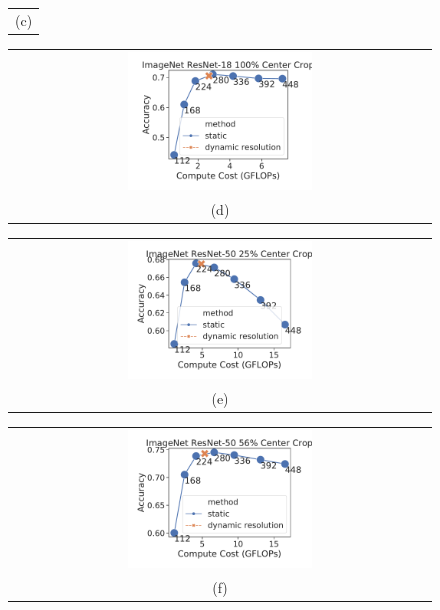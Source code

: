\begin{figure}[t]
\begin{tabular}{@{}c@{}}
    \small (c)
    \end{tabular}
    \begin{tabular}{@{}c@{}}
    \includegraphics[width=0.45\textwidth]{e2e_figures/imagenet_resnet18_full_center.pdf} \\
    \small (d)
    \end{tabular}
    \begin{tabular}{@{}c@{}}
    \includegraphics[width=0.45\textwidth]{e2e_figures/imagenet_resnet50_25_center.pdf} \\
    \small (e)
    \end{tabular}
    \begin{tabular}{@{}c@{}}
    \includegraphics[width=0.45\textwidth]{e2e_figures/imagenet_resnet50_56_center.pdf} \\
    \small (f)
    \end{tabular}
    \begin{tabular}{@{}c@{}}

\end{tabular}
\end{figure}
